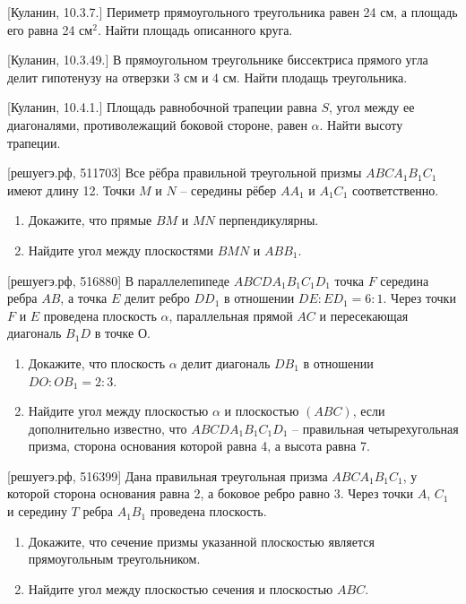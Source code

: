 \documentclass[geometry,a5paper]{pum}
\begin{document}
\begin{exercises}
  \begin{question}
    \textcolor{darkcolortheme}{[Куланин, 10.3.7.]}
    Периметр прямоугольного треугольника равен 24 см, а площадь его равна 24 см$^2$. Найти площадь описанного круга.
  \end{question}
  \begin{question}
    \textcolor{darkcolortheme}{[Куланин, 10.3.49.]}
    В прямоугольном треугольнике биссектриса прямого угла делит гипотенузу на отверзки 3 см и 4 см. Найти плодащь треугольника. 
  \end{question}
  \begin{question}
    \textcolor{darkcolortheme}{[Куланин, 10.4.1.]}
    Площадь равнобочной трапеции равна $S$, угол между ее диагоналями, противолежащий боковой стороне, равен $\alpha$. Найти высоту трапеции.
  \end{question}
  \begin{question}
    \textcolor{darkcolortheme}{[решуегэ.рф, 511703]}
  Все рёбра правильной треугольной призмы $ABCA_1B_1C_1$ имеют длину 12. Точки $M$ и $N$ -- середины рёбер $AA_1$ и $A_1C_1$ соответственно.
    \begin{enumerate}[nosep,label=\asbuk*), ref=\asbuk*]
    \item Докажите, что прямые $BM$ и $MN$ перпендикулярны.
    \item Найдите угол между плоскостями $BMN$ и $ABB_1$.
  \end{enumerate}
\end{question}
  \begin{question}
    \textcolor{darkcolortheme}{[решуегэ.рф, 516880]}
    В параллелепипеде $ABCDA_1B_1C_1D_1$ точка $F$ середина ребра $AB$, а точка $E$ делит ребро $DD_1$ в отношении $DE : ED_1 = 6 : 1$. Через точки $F$ и $E$ проведена плоскость $\alpha$, параллельная прямой $AC$ и пересекающая диагональ $B_1D$ в точке $О$.
    \begin{enumerate}[nosep,label=\asbuk*), ref=\asbuk*]
    \item Докажите, что плоскость $\alpha$ делит диагональ $DB_1$ в отношении $DO : OB_1 = 2 : 3$.
    \item Найдите угол между плоскостью $\alpha$ и плоскостью $(ABC)$, если дополнительно известно, что $ABCDA_1B_1C_1D_1$ -- правильная четырехугольная призма, сторона основания которой равна 4, а высота равна 7.
  \end{enumerate}
\end{question}
  \begin{question}
    \textcolor{darkcolortheme}{[решуегэ.рф, 516399]}
    Дана правильная треугольная призма $ABCA_1B_1C_1$, у которой сторона основания равна 2, а боковое ребро равно 3. Через точки $A$, $C_1$ и середину $T$ ребра $A_1B_1$ проведена плоскость.
    \begin{enumerate}[nosep,label=\asbuk*), ref=\asbuk*]
    \item Докажите, что сечение призмы указанной плоскостью является прямоугольным треугольником.
    \item Найдите угол между плоскостью сечения и плоскостью $ABC$.
  \end{enumerate}
\end{question}
\end{exercises}
\end{document}
